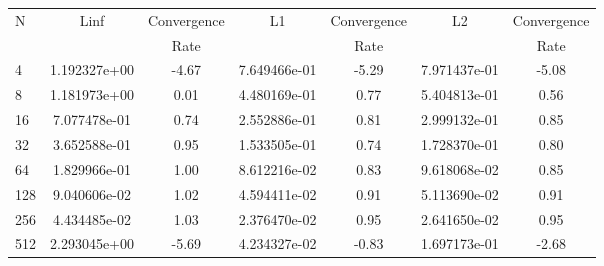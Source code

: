 \documentclass[12pt]{article}
\begin{document}
	\begin{tabular}{l|c|c|c|c|c|c}
		N&Linf&Convergence&L1&Convergence&L2&Convergence\\
		&&Rate&&Rate&&Rate\\
		\hline
		4&1.192327e+00&-4.67&7.649466e-01&-5.29&7.971437e-01&-5.08\\
		\hline
		8&1.181973e+00&0.01&4.480169e-01&0.77&5.404813e-01&0.56\\
		\hline
		16&7.077478e-01&0.74&2.552886e-01&0.81&2.999132e-01&0.85\\
		\hline
		32&3.652588e-01&0.95&1.533505e-01&0.74&1.728370e-01&0.80\\
		\hline
		64&1.829966e-01&1.00&8.612216e-02&0.83&9.618068e-02&0.85\\
		\hline
		128&9.040606e-02&1.02&4.594411e-02&0.91&5.113690e-02&0.91\\
		\hline
		256&4.434485e-02&1.03&2.376470e-02&0.95&2.641650e-02&0.95\\
		\hline
		512&2.293045e+00&-5.69&4.234327e-02&-0.83&1.697173e-01&-2.68\\
	\end{tabular}
\end{document}
